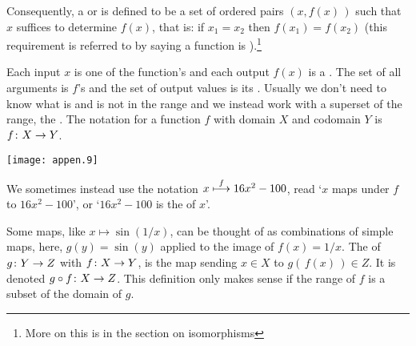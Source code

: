 Consequently, a  
or  is defined
to be a set of ordered pairs \( (x,f(x)\,) \)
such that \( x \) suffices to determine \( f(x) \), that is:
if \( x_1=x_2 \) then \( f(x_1)=f(x_2) \)
(this requirement is referred to by saying a
function is %
).\footnote{More on this is in the section
on isomorphisms}

Each input \( x \) is one of the function's 
 and each
output \( f(x) \) is a .
The set of all arguments is \( f \)'s 
and the set of output values is its 
.
Usually we don't need to know what is and is not in the range and we instead
work with a superset of the range, the
.
The notation for a function \( f \) with domain \( X \) and codomain \( Y \) is
\( \mbox{$f\colon X\to Y$} \).
\begin{center}
  \texttt{[image: appen.9]}
%
%
%
\end{center}
We sometimes instead use the notation \( x\stackrel{f}{\longmapsto} 16x^2-100 \), read
`\( x \) maps under \( f \) to \( 16x^2-100 \)', or
`\( 16x^2-100 \) is the  
of \( x \)'.

Some maps, like \( x\mapsto \sin(1/x) \), can be thought of as
combinations of simple maps, here, 
\( g(y)=\sin(y) \) applied to the image of \( f(x)=1/x \).
The  
of \( \mbox{$g\colon Y\to Z$} \) with \( \mbox{$f\colon X\to Y$} \),
is the map sending
\( x\in X \) to \( g(\, f(x)\,)\in Z \).
It is denoted \( \mbox{$g\mathbin\circ f\colon X\to Z$} \).
This definition only makes sense if the range of \( f \) is a
subset of the domain of \( g \).


